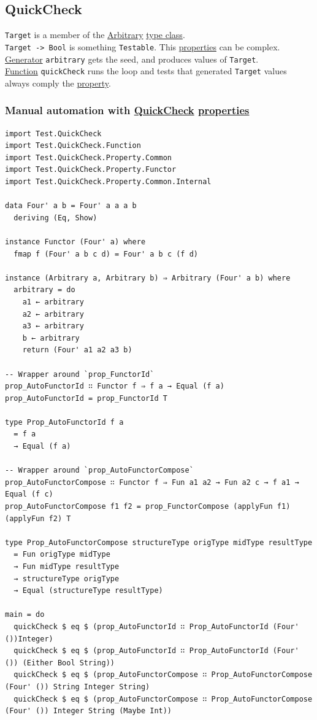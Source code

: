 \documentclass[a4paper,14pt,oneside]{book}
\begin{document}
\subsection{\label{orgaa0967c}QuickCheck}
\label{sec:org701dc3a}
\texttt{Target} is a member of the \hyperref[orgdcbda01]{Arbitrary} \hyperref[org735fa3c]{type class}.\\
\texttt{Target -> Bool} is something \texttt{Testable}. This \hyperref[orge0a1a8a]{properties} can be complex.\\
\hyperref[org0949f7f]{Generator} \texttt{arbitrary} gets the seed, and produces values of \texttt{Target}.\\
\hyperref[org9530a6b]{Function} \texttt{quickCheck} runs the loop and tests that generated \texttt{Target} values always comply the \hyperref[org49b84ac]{property}.\\

\subsubsection{Manual automation with \hyperref[orgaa0967c]{QuickCheck} \hyperref[orge0a1a8a]{properties}}
\label{sec:org29231af}

\begin{verbatim}
import Test.QuickCheck
import Test.QuickCheck.Function
import Test.QuickCheck.Property.Common
import Test.QuickCheck.Property.Functor
import Test.QuickCheck.Property.Common.Internal

data Four' a b = Four' a a a b
  deriving (Eq, Show)

instance Functor (Four' a) where
  fmap f (Four' a b c d) = Four' a b c (f d)

instance (Arbitrary a, Arbitrary b) ⇒ Arbitrary (Four' a b) where
  arbitrary = do
    a1 ← arbitrary
    a2 ← arbitrary
    a3 ← arbitrary
    b ← arbitrary
    return (Four' a1 a2 a3 b)

-- Wrapper around `prop_FunctorId`
prop_AutoFunctorId ∷ Functor f ⇒ f a → Equal (f a)
prop_AutoFunctorId = prop_FunctorId T

type Prop_AutoFunctorId f a
  = f a
  → Equal (f a)

-- Wrapper around `prop_AutoFunctorCompose`
prop_AutoFunctorCompose ∷ Functor f ⇒ Fun a1 a2 → Fun a2 c → f a1 → Equal (f c)
prop_AutoFunctorCompose f1 f2 = prop_FunctorCompose (applyFun f1) (applyFun f2) T

type Prop_AutoFunctorCompose structureType origType midType resultType
  = Fun origType midType
  → Fun midType resultType
  → structureType origType
  → Equal (structureType resultType)

main = do
  quickCheck $ eq $ (prop_AutoFunctorId ∷ Prop_AutoFunctorId (Four' ())Integer)
  quickCheck $ eq $ (prop_AutoFunctorId ∷ Prop_AutoFunctorId (Four' ()) (Either Bool String))
  quickCheck $ eq $ (prop_AutoFunctorCompose ∷ Prop_AutoFunctorCompose (Four' ()) String Integer String)
  quickCheck $ eq $ (prop_AutoFunctorCompose ∷ Prop_AutoFunctorCompose (Four' ()) Integer String (Maybe Int))
\end{verbatim}
\end{document}
